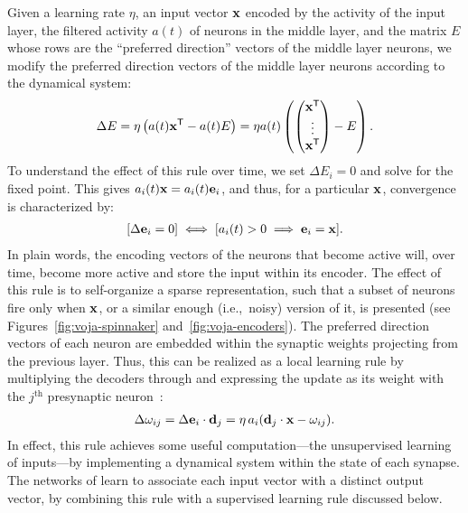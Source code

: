 Given a learning rate $\eta$, an input vector $\mathbf{x}$ encoded by the activity of the input layer, the filtered activity $a(t)$ of  neurons in the middle layer, and the matrix $E$ whose rows are the ``preferred direction'' vectors of the middle layer neurons, we modify the preferred direction vectors of the middle layer neurons according to the dynamical system:
\begin{align} \label{voja}
    \Delta{E} = \eta \left( a(t) {\mathbf{x}}^\mathsf{T} - a(t)E \right) = \eta a(t) \left( \begin{pmatrix} {\mathbf{x}}^\mathsf{T} \\ \vdots \\ {\mathbf{x}}^\mathsf{T} \end{pmatrix} - E \right) \text{.}
\end{align}
To understand the effect of this rule over time, we set $\Delta{E_i} = 0$ and solve for the fixed point.
This gives $a_i(t) \mathbf{x} = a_i(t) \mathbf{e}_i$, and thus, for a particular $\mathbf{x}$, convergence is characterized by:
\begin{align} \label{stability}
    [\Delta{\mathbf{e}_i} = 0]  \iff  [a_i(t) > 0  \implies  \mathbf{e}_i = \mathbf{x}] \text{.}
\end{align}
In plain words, the encoding vectors of the neurons that become active will, over time, become more active and store the input within its encoder.
The effect of this rule is to self-organize a sparse representation, such that a subset of neurons fire only when $\mathbf{x}$, or a similar enough (i.e.,~noisy) version of it, is presented (see Figures~\ref{fig:voja-spinnaker} and~\ref{fig:voja-encoders}).
The preferred direction vectors of each neuron are embedded within the synaptic weights projecting from the previous layer.
Thus, this can be realized as a local learning rule by multiplying the decoders through and expressing the update as its weight with the $j^\text{th}$ presynaptic neuron~\citep{knight2016}:
\begin{align}
  \label{eq:voja-weights}
  \Delta \omega_{ij} = \Delta \mathbf{e}_i \cdot \mathbf{d}_j = \eta \, a_i (\mathbf{d}_j \cdot \mathbf{x} - \omega_{ij}) \text{.}
\end{align}
In effect, this rule achieves some useful computation---the unsupervised learning of inputs---by implementing a dynamical system within the state of each synapse.
The networks of \citet{knight2016, aubin2016a} learn to associate each input vector with a distinct output vector, by combining this rule with a supervised learning rule discussed below.


